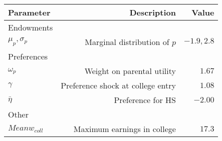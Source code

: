 \begin{tabular}{lrr}
\hline
Parameter & Description  & Value  \\
\hline
Endowments &   &   \\
$\mu_{p}, \sigma_{p}$ & Marginal distribution of $p$  & $-1.9, 2.8$  \\
Preferences &   &   \\
$\omega_{p}$ & Weight on parental utility  & $1.67$  \\
$\gamma$ & Preference shock at college entry  & $1.08$  \\
$\bar{\eta}$ & Preference for HS  & $-2.00$  \\
Other &   &   \\
$Mean w_{coll}$ & Maximum earnings in college  & $17.3$  \\
\hline
\end{tabular}%
